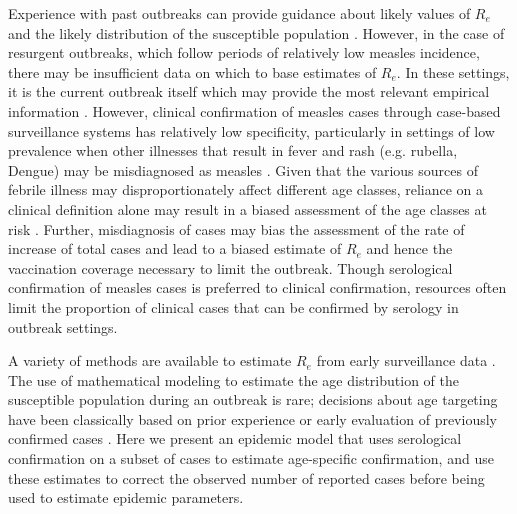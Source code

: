 Experience with past outbreaks can provide guidance about likely values of \(R_{e}\) \cite{Durrheim_2014} and the likely distribution of the
susceptible population \cite{Goodson_2011, 25803382}. However, in the case of resurgent outbreaks, which follow periods of relatively low
measles incidence, there may be insufficient data on which to base estimates of \(R_e\). In these settings, it is the current outbreak itself which may provide the most relevant empirical information \cite{Durrheim_2014, Merl_2009, Shea_2014}. However, clinical confirmation of measles cases through case-based surveillance systems has relatively low specificity, particularly in settings of low prevalence \cite{Hutchins_2004,Ho_2014,GUY_2004,31c964} when other illnesses that result in fever and rash (e.g. rubella, Dengue) may be misdiagnosed as measles \cite{Ho_2014}. Given that the various sources of febrile illness may disproportionately affect different age classes, reliance on a clinical definition alone may result in a biased assessment of the age classes at risk \cite{Hutchins_2004,Durrheim_2014}. Further, misdiagnosis of
cases may bias the assessment of the rate of increase of total cases and lead to a biased estimate of \(R_{e}\) and hence the vaccination
coverage necessary to limit the outbreak. Though serological confirmation of measles cases is preferred to clinical confirmation,
resources often limit the proportion of clinical cases that can be confirmed by serology in outbreak settings. 

A variety of methods are available to estimate \(R_{e}\) from early surveillance data \cite{Durrheim_2014,Chiew_2013,Ferrari_2005,Lipsitch_2003} . The use of mathematical modeling to estimate the age distribution of the susceptible population during an outbreak is rare; decisions about age targeting have been classically based
on prior experience or early evaluation of previously confirmed cases \cite{Minetti_2013a}. Here we present an epidemic
model that uses serological confirmation on a subset of cases to estimate age-specific confirmation, and use these estimates to correct the observed number of reported cases before being used to estimate epidemic parameters.

